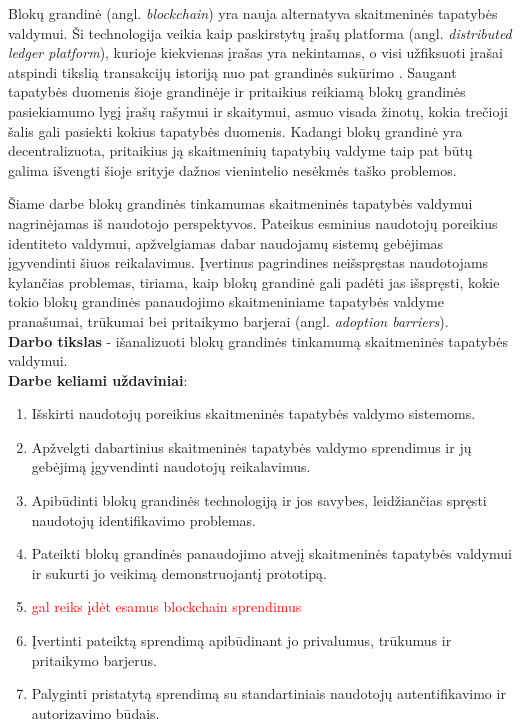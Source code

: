 Blokų grandinė (angl. \textit{blockchain}) yra nauja alternatyva skaitmeninės tapatybės valdymui. Ši technologija veikia kaip
paskirstytų įrašų platforma (angl. \textit{distributed ledger platform}), kurioje kiekvienas įrašas yra nekintamas, o visi
užfiksuoti įrašai atspindi tikslią transakcijų istoriją nuo pat grandinės sukūrimo \cite{Baars2016}. Saugant tapatybės duomenis šioje grandinėje ir
pritaikius reikiamą blokų grandinės pasiekiamumo lygį įrašų rašymui ir skaitymui, asmuo visada
žinotų, kokia trečioji šalis gali pasiekti kokius tapatybės duomenis. Kadangi blokų grandinė yra decentralizuota, pritaikius ją skaitmeninių tapatybių valdyme taip pat
būtų galima išvengti šioje srityje dažnos vienintelio nesėkmės taško problemos. 

Šiame darbe blokų grandinės tinkamumas skaitmeninės tapatybės valdymui nagrinėjamas iš naudotojo perspektyvos.
Pateikus esminius naudotojų poreikius identiteto valdymui,
apžvelgiamas dabar naudojamų sistemų gebėjimas įgyvendinti šiuos reikalavimus. Įvertinus pagrindines neišspręstas naudotojams kylančias problemas,
tiriama, kaip blokų grandinė gali padėti jas išspręsti, kokie tokio blokų grandinės panaudojimo skaitmeniniame tapatybės valdyme
pranašumai, trūkumai bei pritaikymo barjerai (angl. \textit{adoption barriers}).
\\

\textbf{Darbo tikslas} - išanalizuoti blokų grandinės tinkamumą skaitmeninės tapatybės valdymui.
\\

\textbf{Darbe keliami uždaviniai}:

\begin{enumerate}
    \item Išskirti naudotojų poreikius skaitmeninės tapatybės valdymo sistemoms.
    \item Apžvelgti dabartinius skaitmeninės tapatybės valdymo sprendimus ir jų gebėjimą
    įgyvendinti naudotojų reikalavimus.
    \item Apibūdinti blokų grandinės technologiją ir jos savybes, leidžiančias spręsti naudotojų identifikavimo problemas.
    \item Pateikti blokų grandinės panaudojimo atvejį skaitmeninės tapatybės valdymui ir sukurti jo veikimą demonstruojantį prototipą.
    \item \textcolor{red}{gal reiks įdėt esamus blockchain sprendimus}
    \item Įvertinti pateiktą sprendimą apibūdinant jo privalumus, trūkumus ir pritaikymo barjerus.
    \item Palyginti pristatytą sprendimą su standartiniais naudotojų autentifikavimo ir autorizavimo būdais.
\end{enumerate}